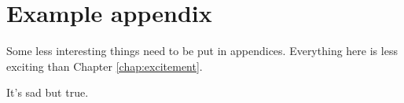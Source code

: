 \chapter{Example appendix}
\label{app:example}

Some less interesting things need to be put in appendices. Everything here is less exciting than Chapter \ref{chap:excitement}.

\newpage
It's sad but true.